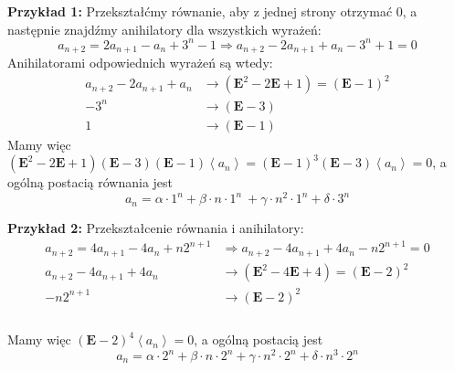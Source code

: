 \documentclass[a4paper,12pt]{article}
\newcommand{\annihilator}{\mathbf{E}}					%
\newcommand{\sequence}[1]{\left\langle #1 \right\rangle} %
\begin{document}
\noindent \newline \textbf{Przykład 1:} Przekształćmy równanie, aby z jednej strony otrzymać $0$, a następnie znajdźmy anihilatory dla wszystkich wyrażeń:
\[ a_{n+2} = 2 a_{n+1} - a_{n} + 3^n - 1 \Longrightarrow a_{n+2} - 2 a_{n+1} + a_{n} - 3^n + 1 = 0 \]
Anihilatorami odpowiednich wyrażeń są wtedy:
\begin{align*}
	a_{n+2} - 2 a_{n+1} + a_n 	&\longrightarrow (\annihilator^2 - 2\annihilator + 1) = (\annihilator - 1)^2  \\
	-3^n						&\longrightarrow (\annihilator - 3) \\
	1							&\longrightarrow (\annihilator - 1)
\end{align*}
Mamy więc $(\annihilator^2 - 2\annihilator + 1)(\annihilator - 3)(\annihilator - 1)\sequence{a_n} = (\annihilator - 1)^3 (\annihilator - 3) \sequence{a_n} = 0$, a ogólną postacią równania jest
\[ a_n = \alpha \cdot 1^n + \beta \cdot n \cdot 1^n \ + \gamma \cdot n^2 \cdot 1^n + \delta \cdot 3^n \]

\noindent \textbf{Przykład 2:} Przekształcenie równania i anihilatory:
\begin{align*}
	a_{n+2} = 4 a_{n+1} - 4 a_{n} + n2^{n+1} &\Longrightarrow a_{n+2} - 4 a_{n+1} + 4 a_{n} - n2^{n+1} = 0 \\
	a_{n+2} - 4 a_{n+1} + 4 a_{n} 	&\longrightarrow (\annihilator^2 - 4\annihilator + 4) = (\annihilator - 2)^2  \\
	-n2^{n+1}						&\longrightarrow (\annihilator - 2)^2 \\
\end{align*}\\[-30pt]
Mamy więc $(\annihilator - 2)^4 \sequence{a_n} = 0$, a ogólną postacią jest
\[ a_n = \alpha \cdot 2^n + \beta \cdot n \cdot 2^n + \gamma \cdot n^2 \cdot 2^n + \delta \cdot n^3 \cdot 2^n \]
\end{document}
